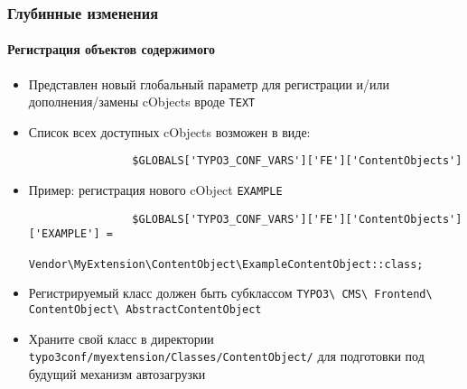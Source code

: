 
\begin{frame}[fragile]
	\frametitle{Глубинные изменения}
	\framesubtitle{Регистрация объектов содержимого}

	\begin{itemize}

		\item Представлен новый глобальный параметр для регистрации и/или дополнения/замены cObjects вроде
			\texttt{TEXT}

		\item Список всех доступных cObjects возможен в виде:

			\begin{lstlisting}
				$GLOBALS['TYPO3_CONF_VARS']['FE']['ContentObjects']
			\end{lstlisting}

		\item Пример: регистрация нового cObject \texttt{EXAMPLE}

			\begin{lstlisting}
				$GLOBALS['TYPO3_CONF_VARS']['FE']['ContentObjects']['EXAMPLE'] =
				  Vendor\MyExtension\ContentObject\ExampleContentObject::class;
			\end{lstlisting}

		\item Регистрируемый класс должен быть субклассом
			\small
				\texttt{TYPO3\textbackslash
					CMS\textbackslash
					Frontend\textbackslash
					ContentObject\textbackslash
					AbstractContentObject}
			\normalsize

		\item Храните свой класс в директории\newline
			\small
				\texttt{typo3conf/myextension/Classes/ContentObject/}
			\normalsize\newline
			для подготовки под будущий механизм автозагрузки

	\end{itemize}

\end{frame}


